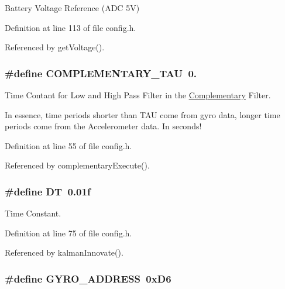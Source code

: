 Battery Voltage Reference (A\-D\-C 5\-V) 



Definition at line 113 of file config.\-h.



Referenced by get\-Voltage().

\hypertarget{group__config_ga61cd22949cc88bd899de6b20cb61e959}{
\subsubsection[{C\-O\-M\-P\-L\-E\-M\-E\-N\-T\-A\-R\-Y\-\_\-\-T\-A\-U}]{\setlength{\rightskip}{0pt plus 5cm}\#define C\-O\-M\-P\-L\-E\-M\-E\-N\-T\-A\-R\-Y\-\_\-\-T\-A\-U~0.}}\label{group__config_ga61cd22949cc88bd899de6b20cb61e959}


Time Contant for Low and High Pass Filter in the \hyperlink{struct_complementary}{Complementary} Filter. 

In essence, time periods shorter than T\-A\-U come from gyro data, longer time periods come from the Accelerometer data. In seconds! 

Definition at line 55 of file config.\-h.



Referenced by complementary\-Execute().

\hypertarget{group__config_ga943f07034774ef1261d62cd0d3d1fec9}{
\subsubsection[{D\-T}]{\setlength{\rightskip}{0pt plus 5cm}\#define D\-T~0.\-01f}}\label{group__config_ga943f07034774ef1261d62cd0d3d1fec9}


Time Constant. 



Definition at line 75 of file config.\-h.



Referenced by kalman\-Innovate().

\hypertarget{group__config_ga8ed1f343e82440b4ef900e5fe42d74f0}{
\subsubsection[{G\-Y\-R\-O\-\_\-\-A\-D\-D\-R\-E\-S\-S}]{\setlength{\rightskip}{0pt plus 5cm}\#define G\-Y\-R\-O\-\_\-\-A\-D\-D\-R\-E\-S\-S~0x\-D6}}\label{group__config_ga8ed1f343e82440b4ef900e5fe42d74f0}


